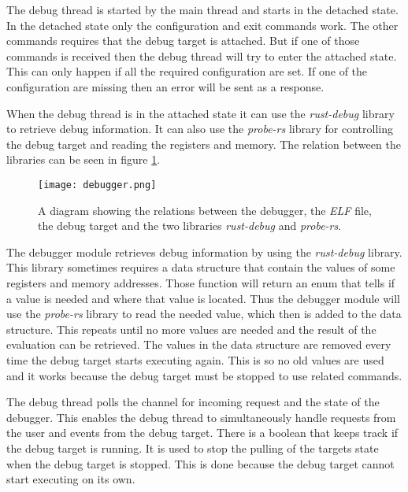 The debug thread is started by the main thread and starts in the detached state.
In the detached state only the configuration and exit commands work.
The other commands requires that the debug target is attached.
But if one of those commands is received then the debug thread will try to enter the attached state.
This can only happen if all the required configuration are set.
If one of the configuration are missing then an error will be sent as a response.


When the debug thread is in the attached state it can use the \emph{rust-debug} library to retrieve debug information.
It can also use the \emph{probe-rs} library for controlling the debug target and reading the registers and memory.
The relation between the libraries can be seen in figure \ref{fig:debugger}.


\begin{figure}[h]
	\centering
	\texttt{[image: debugger.png]}
	\caption{A diagram showing the relations between the debugger, the \emph{ELF} file, the debug target and the two libraries \emph{rust-debug} and \emph{probe-rs}.}
	\label{fig:debugger}
\end{figure}


The debugger module retrieves debug information by using the \emph{rust-debug} library.
This library sometimes requires a data structure that contain the values of some registers and memory addresses.
Those function will return an enum that tells if a value is needed and where that value is located.
Thus the debugger module will use the \emph{probe-rs} library to read the needed value, which then is added to the data structure.
This repeats until no more values are needed and the result of the evaluation can be retrieved.
The values in the data structure are removed every time the debug target starts executing again.
This is so no old values are used and it works because the debug target must be stopped to use related commands.



The debug thread polls the channel for incoming request and the state of the debugger.
This enables the debug thread to simultaneously handle requests from the user and events from the debug target.
There is a boolean that keeps track if the debug target is running.
It is used to stop the pulling of the targets state when the debug target is stopped.
This is done because the debug target cannot start executing on its own.


